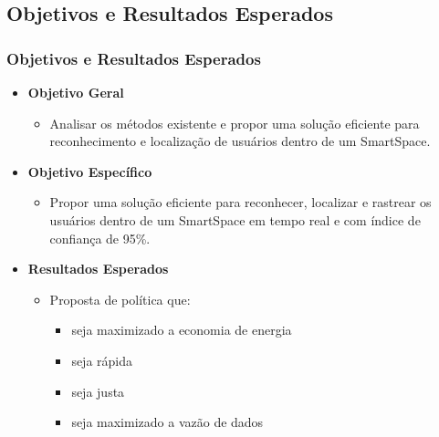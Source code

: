 \documentclass{beamer}
\begin{document}
\subsection{Objetivos e Resultados Esperados}
\begin{frame}
    \frametitle{Objetivos e Resultados Esperados}
    \begin{itemize}
      \item \textbf{Objetivo Geral}
        \begin{itemize}
          \item Analisar os métodos existente e propor uma solução eficiente para reconhecimento e localização de usuários dentro de um SmartSpace.
        \end{itemize}
      \item \textbf{Objetivo Específico}
        \begin{itemize}
          \item Propor uma solução eficiente para reconhecer, localizar e rastrear os usuários dentro de um SmartSpace em tempo real e com índice de confiança de 95\%.
        \end{itemize}
      \item \textbf{Resultados Esperados}
        \begin{itemize}
          \item Proposta de política que:
            \begin{itemize}
              \item seja maximizado a economia de energia
              \item seja rápida
              \item seja justa
              \item seja maximizado a vazão de dados
            \end{itemize}
        \end{itemize}
    \end{itemize}
\end{frame}
\end{document}
